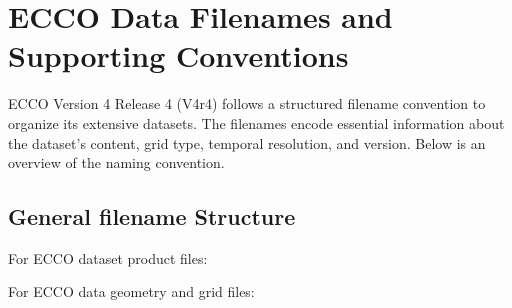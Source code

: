 \pagebreak
\section{ECCO Data Filenames and Supporting Conventions}


ECCO Version 4 Release 4 (V4r4) follows a structured filename convention to organize its extensive datasets. The filenames encode essential information about the dataset's content, grid type, temporal resolution, and version. Below is an overview of the naming convention.

\subsection{General filename Structure}
\par \vspace{0.25cm}

\par For ECCO dataset product files:

\par \vspace{0.5cm}
\begin{center}
\small{\textbf{\selectfont{[ShortName]\_[TemporalResolution]\_[Indicative Time]\_ECCO\_[Version]\_[GridType].<File Type>}}}
\end{center}
\par \vspace{0.5cm}
\par For ECCO data geometry and grid files:

\par \vspace{0.5cm}
\begin{center}
    \small{\textbf{\selectfont{[ShortName]\_ECCO\_[Version]\_[GridType].<File Type>}}}
\end{center}
\par \vspace{0.25cm}

